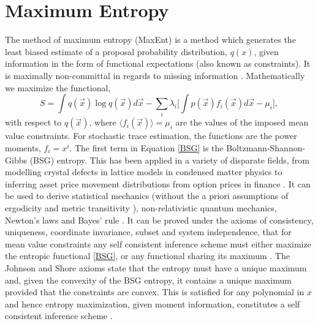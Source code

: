 \documentclass[journal]{IEEEtran}
\begin{document}
	\section{Maximum Entropy}
The method of maximum entropy (MaxEnt) \cite{maxentreview} is a method which generates the least biased estimate of a proposal probability distribution, $q(x)$, given information in the form of functional expectations (also known as constraints). It is maximally non-committal in regards to missing information \cite{inftheoryjaynes}. Mathematically we maximize the functional,
\begin{equation}
\label{BSG}
S = \int q(\vec{x})\log q(\vec{x})d\vec{x}- \sum_{i}\lambda_{i}\bigg[\int p(\vec{x})f_{i}(\vec{x})d\vec{x} - \mu_{i}\bigg],
\end{equation}
with respect to $q(\vec{x})$, where $\langle f_{i}(\vec{x})\rangle = \mu_{i}$ are the values of the imposed mean value constraints. For stochastic trace estimation, the functions are the power moments, $f_{i} = x^{i}$. The first term in Equation \eqref{BSG} is the Boltzmann-Shannon-Gibbs (BSG) entropy. This has been applied in a variety of disparate fields, from modelling crystal defects in lattice models in condensed matter physics \cite{giffin} to inferring asset price movement distributions from option prices in finance \cite{nerioptions,entropybuchen}. It can be used to derive statistical mechanics (without the a priori assumptions of ergodicity and metric transitivity \cite{diego}), non-relativistic quantum mechanics, Newton's laws and Bayes' rule \cite{Gonzalez2014,caticha2012entropic}. It can be proved under the axioms of consistency, uniqueness, coordinate invariance, subset and system independence, that for mean value constraints any self consistent inference scheme must either maximize the entropic functional \eqref{BSG}, or any functional sharing its maximum \cite{shore1980axiomatic,maxentreview}. The Johnson and Shore axioms state that the entropy must have a unique maximum \cite{shore1980axiomatic} and, given the convexity of the BSG entropy, it contains a unique maximum provided that the constraints are convex. This is satisfied for any polynomial in $x$ and hence entropy maximization, given moment information, constitutes a self consistent inference scheme \cite{maxentreview}.
	
\end{document}

